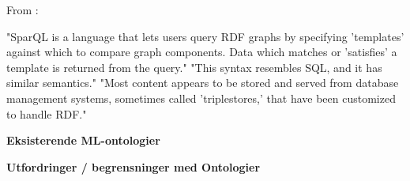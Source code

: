 From \parencite{grobe2009rdf_jena_sparql_semantic_web}:

"SparQL is a language that lets users query RDF graphs by specifying 'templates' against which to compare graph components. Data which matches or 'satisfies' a template is returned from the query."
"This syntax resembles SQL, and it has similar semantics."
"Most content appears to be stored and served from database management systems, sometimes called 'triplestores,' that have been customized to handle RDF."

\textbf{Eksisterende ML-ontologier}


\textbf{Utfordringer / begrensninger med Ontologier}
